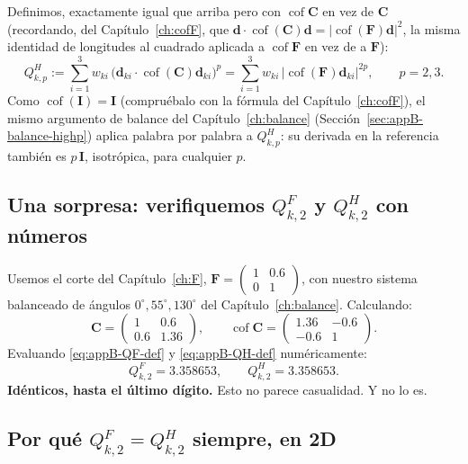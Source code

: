 \documentclass[11pt,a4paper]{article}
\newcommand{\Cof}{\operatorname{cof}}
\begin{document}
Definimos, exactamente igual que arriba pero con $\Cof\bm C$ en vez de
$\bm C$ (recordando, del Cap\'itulo~\ref{ch:cofF}, que
$\bm d\cdot\Cof(\bm C)\bm d=|\Cof(\bm F)\bm d|^2$, la misma identidad
de longitudes al cuadrado aplicada a $\Cof\bm F$ en vez de a $\bm F$):
\begin{equation}
 Q_{k,p}^H:=\sum_{i=1}^3 w_{ki}\,\big(\bm d_{ki}\cdot\Cof(\bm C)\bm d_{ki}\big)^p
 =\sum_{i=1}^3 w_{ki}\,|\Cof(\bm F)\bm d_{ki}|^{2p},
 \qquad p=2,3.
 \label{eq:appB-QH-def}
\end{equation}
Como $\Cof(\bm I)=\bm I$ (compru\'ebalo con la f\'ormula del
Cap\'itulo~\ref{ch:cofF}), el mismo argumento de balance del
Cap\'itulo~\ref{ch:balance} (Secci\'on~\ref{sec:appB-balance-highp})
aplica palabra por palabra a $Q_{k,p}^H$: su derivada en la referencia
tambi\'en es $p\,\bm I$, isotr\'opica, para cualquier $p$.

\subsection{Una sorpresa: verifiquemos $Q^F_{k,2}$ y $Q^H_{k,2}$ con n\'umeros}

Usemos el corte del Cap\'itulo~\ref{ch:F},
$\bm F=\begin{pmatrix}1&0.6\\0&1\end{pmatrix}$, con nuestro sistema
balanceado de \'angulos $0^\circ,55^\circ,130^\circ$ del
Cap\'itulo~\ref{ch:balance}. Calculando:
\[
 \bm C=\begin{pmatrix}1&0.6\\0.6&1.36\end{pmatrix},\qquad
 \Cof\bm C=\begin{pmatrix}1.36&-0.6\\-0.6&1\end{pmatrix}.
\]
Evaluando \eqref{eq:appB-QF-def} y \eqref{eq:appB-QH-def} num\'ericamente:
\[
 Q_{k,2}^F=3.358653,\qquad Q_{k,2}^H=3.358653.
\]
\textbf{Id\'enticos, hasta el \'ultimo d\'igito.} Esto no parece
casualidad. Y no lo es.

\subsection{Por qu\'e $Q^F_{k,2}=Q^H_{k,2}$ \textbf{siempre}, en 2D}
\end{document}
